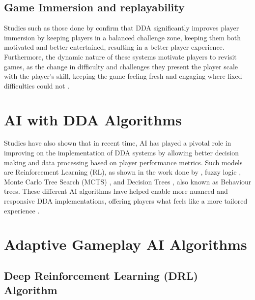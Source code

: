 \begin{spacing}{2.0}
	\subsection{Game Immersion and replayability}

	Studies such as those done by \cite{mercieca_evaluating_2023} \cite{attard_analysing_2021} \cite{mifsud_utilizing_2021} \cite{laus_dynamic_2022} \cite{vang_impact_2022} confirm that DDA significantly improves player immersion by keeping players in a balanced challenge zone, keeping them both motivated and better entertained, resulting in
	a better player experience. Furthermore, the dynamic nature of these systems motivate players to revisit games, as the change in difficulty and challenges they present the player scale with the player's skill,
	keeping the game feeling fresh and engaging where fixed difficulties could not \cite{grech_creating_2023} \cite{attard_analysing_2021} \cite{mifsud_utilizing_2021} \cite{laus_dynamic_2022} \cite{sepulveda_exploring_2019}.

	\section{AI with DDA Algorithms}

	Studies have also shown that in recent time, AI has played a pivotal role in improving on the implementation of DDA systems by allowing better decision making and data processing based on player performance metrics.
	Such models are Reinforcement Learning (RL), as shown in the work done by \cite{mercieca_evaluating_2023} \cite{mifsud_utilizing_2021} \cite{zheng_dynamic_2024}, fuzzy logic \cite{chrysafiadi_fuzzy_based_2023}, Monte Carlo Tree Search (MCTS) \cite{demediuk_monte_2017} \cite{soemers_enhancements_2016}, and Decision Trees \cite{sejrsgaard_jacobsen_dynamic_2011}, also known as Behaviour trees.
	These different AI algorithms have helped enable more nuanced and responsive DDA implementations, offering players what feels like a more tailored experience \cite{attard_analysing_2021} \cite{vodopivec_monte_2017} \cite{chrysafiadi_fuzzy_based_2023}.

	\section{Adaptive Gameplay AI Algorithms}

	\subsection{Deep Reinforcement Learning (DRL) Algorithm}


\end{spacing}
